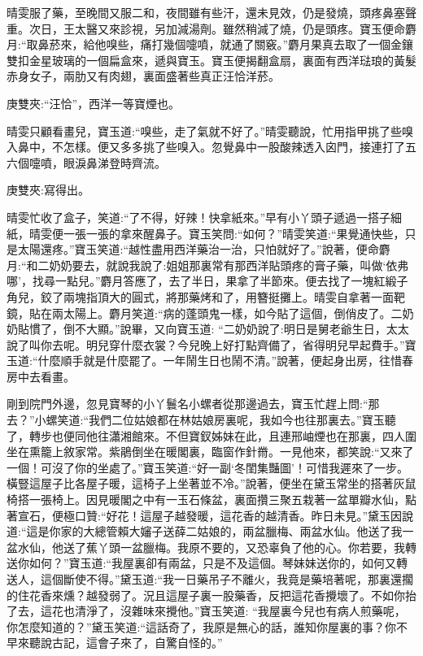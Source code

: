 \begin{parag}
    晴雯服了藥，至晚間又服二和，夜間雖有些汗，還未見效，仍是發燒，頭疼鼻塞聲重。次日，王太醫又來診視，另加減湯劑。雖然稍減了燒，仍是頭疼。寶玉便命麝月:“取鼻菸來，給他嗅些，痛打幾個嚏噴，就通了關竅。”麝月果真去取了一個金鑲雙扣金星玻璃的一個扁盒來，遞與寶玉。寶玉便揭翻盒扇，裏面有西洋琺琅的黃髮赤身女子，兩肋又有肉翅，裏面盛著些真正汪恰洋菸。\begin{note}庚雙夾:“汪恰”，西洋一等寶煙也。\end{note}晴雯只顧看畫兒，寶玉道:“嗅些，走了氣就不好了。”晴雯聽說，忙用指甲挑了些嗅入鼻中，不怎樣。便又多多挑了些嗅入。忽覺鼻中一股酸辣透入囟門，接連打了五六個嚏噴，眼淚鼻涕登時齊流。\begin{note}庚雙夾:寫得出。\end{note}晴雯忙收了盒子，笑道:“了不得，好辣！快拿紙來。”早有小丫頭子遞過一搭子細紙，晴雯便一張一張的拿來醒鼻子。寶玉笑問:“如何？”晴雯笑道:“果覺通快些，只是太陽還疼。”寶玉笑道:“越性盡用西洋藥治一治，只怕就好了。”說著，便命麝月:“和二奶奶要去，就說我說了:姐姐那裏常有那西洋貼頭疼的膏子藥，叫做‘依弗哪’，找尋一點兒。”麝月答應了，去了半日，果拿了半節來。便去找了一塊紅緞子角兒，鉸了兩塊指頂大的圓式，將那藥烤和了，用簪挺攤上。晴雯自拿著一面靶鏡，貼在兩太陽上。麝月笑道:“病的蓬頭鬼一樣，如今貼了這個，倒俏皮了。二奶奶貼慣了，倒不大顯。”說畢，又向寶玉道: “二奶奶說了:明日是舅老爺生日，太太說了叫你去呢。明兒穿什麼衣裳？今兒晚上好打點齊備了，省得明兒早起費手。”寶玉道:“什麼順手就是什麼罷了。一年鬧生日也鬧不清。”說著，便起身出房，往惜春房中去看畫。
\end{parag}


\begin{parag}
    剛到院門外邊，忽見寶琴的小丫鬟名小螺者從那邊過去，寶玉忙趕上問:“那去？”小螺笑道:“我們二位姑娘都在林姑娘房裏呢，我如今也往那裏去。”寶玉聽了，轉步也便同他往瀟湘館來。不但寶釵姊妹在此，且連邢岫煙也在那裏，四人圍坐在熏籠上敘家常。紫鵑倒坐在暖閣裏，臨窗作針黹。一見他來，都笑說:“又來了一個！可沒了你的坐處了。”寶玉笑道:“好一副‘冬閨集豔圖’！可惜我遲來了一步。橫豎這屋子比各屋子暖，這椅子上坐著並不冷。”說著，便坐在黛玉常坐的搭著灰鼠椅搭一張椅上。因見暖閣之中有一玉石條盆，裏面攢三聚五栽著一盆單瓣水仙，點著宣石，便極口贊:“好花！這屋子越發暖，這花香的越清香。昨日未見。”黛玉因說道:“這是你家的大總管賴大嬸子送薛二姑娘的，兩盆臘梅、兩盆水仙。他送了我一盆水仙，他送了蕉丫頭一盆臘梅。我原不要的，又恐辜負了他的心。你若要，我轉送你如何？”寶玉道:“我屋裏卻有兩盆，只是不及這個。琴妹妹送你的，如何又轉送人，這個斷使不得。”黛玉道:“我一日藥吊子不離火，我竟是藥培著呢，那裏還擱的住花香來燻？越發弱了。況且這屋子裏一股藥香，反把這花香攪壞了。不如你抬了去，這花也清淨了，沒雜味來攪他。”寶玉笑道: “我屋裏今兒也有病人煎藥呢，你怎麼知道的？”黛玉笑道:“這話奇了，我原是無心的話，誰知你屋裏的事？你不早來聽說古記，這會子來了，自驚自怪的。”
\end{parag}



